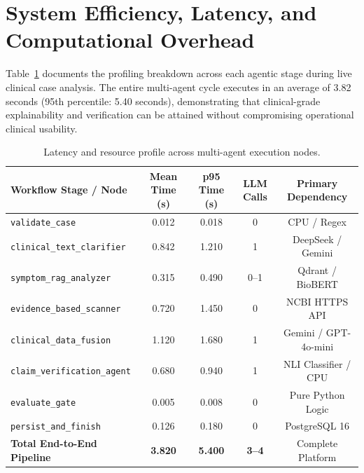 \documentclass[12pt,a4paper]{report}
\begin{document}
\section{System Efficiency, Latency, and Computational Overhead}
Table~\ref{tab:latency_profile} documents the profiling breakdown across each agentic stage during live clinical case analysis. The entire multi-agent cycle executes in an average of 3.82 seconds (95th percentile: 5.40 seconds), demonstrating that clinical-grade explainability and verification can be attained without compromising operational clinical usability.

\begin{table}[H]
\centering
\caption{Latency and resource profile across multi-agent execution nodes.}
\label{tab:latency_profile}
\small
\begin{tabularx}{\textwidth}{lcccc}
\toprule
\textbf{Workflow Stage / Node} & \textbf{Mean Time (s)} & \textbf{p95 Time (s)} & \textbf{LLM Calls} & \textbf{Primary Dependency} \\
\midrule
\texttt{validate\_case} & 0.012 & 0.018 & 0 & CPU / Regex \\
\texttt{clinical\_text\_clarifier} & 0.842 & 1.210 & 1 & DeepSeek / Gemini \\
\texttt{symptom\_rag\_analyzer} & 0.315 & 0.490 & 0--1 & Qdrant / BioBERT \\
\texttt{evidence\_based\_scanner} & 0.720 & 1.450 & 0 & NCBI HTTPS API \\
\texttt{clinical\_data\_fusion} & 1.120 & 1.680 & 1 & Gemini / GPT-4o-mini \\
\texttt{claim\_verification\_agent} & 0.680 & 0.940 & 1 & NLI Classifier / CPU \\
\texttt{evaluate\_gate} & 0.005 & 0.008 & 0 & Pure Python Logic \\
\texttt{persist\_and\_finish} & 0.126 & 0.180 & 0 & PostgreSQL 16 \\
\midrule
\textbf{Total End-to-End Pipeline} & \textbf{3.820} & \textbf{5.400} & \textbf{3--4} & Complete Platform \\
\bottomrule
\end{tabularx}
\end{table}
\end{document}
